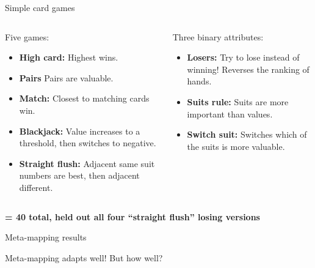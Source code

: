 \documentclass{beamer}
\begin{document}
\begin{frame}{Simple card games}

\begin{columns}
\begin{column}{0.5\textwidth}
Five games:
\begin{itemize}
\item \textbf{High card:} Highest wins.
\item \textbf{Pairs} Pairs are valuable. 
\item \textbf{Match:} Closest to matching cards win. 
\item \textbf{Blackjack:} Value increases to a threshold, then switches to negative. 
\item \textbf{Straight flush:} Adjacent same suit numbers are best, then adjacent different. 
\end{itemize}
\end{column}

\begin{column}{0.5\textwidth}
Three binary attributes:
\begin{itemize}
\item \textbf{Losers:} Try to lose instead of winning! Reverses the ranking of hands.
\item \textbf{Suits rule:} Suits are more important than values. 
\item \textbf{Switch suit:} Switches which of the suits is more valuable.
\end{itemize}
\vspace{3.2em}
\end{column}
\end{columns}
\vspace{1em}
\textbf{= 40 total, held out all four ``straight flush'' losing versions}
\end{frame}

\begin{frame}{Meta-mapping results}
\end{frame}

\begin{frame}[standout]
Meta-mapping adapts well! But how well?
\end{frame}
\end{document}
